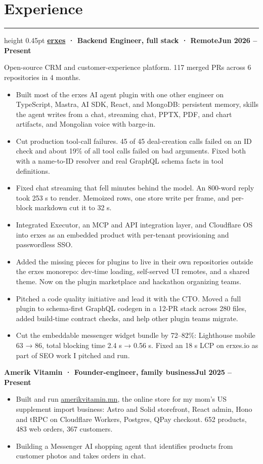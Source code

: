 \documentclass[9.5pt,letterpaper]{article}
\newcommand{\cvsection}[1]{\section*{#1}\vspace{3pt}\hrule height 0.45pt\vspace{3pt}}
\newcommand{\dated}[2]{#1\hfill#2\par}
\begin{document}
\cvsection{Experience}
\dated{\textbf{\href{https://github.com/erxes/erxes}{\textcolor{linkblue}{erxes}} · Backend Engineer, full stack · Remote}}{\textbf{Jun 2026 – Present}}
Open-source CRM and customer-experience platform. 117 merged PRs across 6 repositories in 4 months.
\begin{itemize}
  \item Built most of the erxes AI agent plugin with one other engineer on TypeScript, Mastra, AI SDK, React, and MongoDB: persistent memory, skills the agent writes from a chat, streaming chat, PPTX, PDF, and chart artifacts, and Mongolian voice with barge-in.
  \item Cut production tool-call failures. 45 of 45 deal-creation calls failed on an ID check and about 19\% of all tool calls failed on bad arguments. Fixed both with a name-to-ID resolver and real GraphQL schema facts in tool definitions.
  \item Fixed chat streaming that fell minutes behind the model. An 800-word reply took 253 s to render. Memoized rows, one store write per frame, and per-block markdown cut it to 32 s.
  \item Integrated Executor, an MCP and API integration layer, and Cloudflare OS into erxes as an embedded product with per-tenant provisioning and passwordless SSO.
  \item Added the missing pieces for plugins to live in their own repositories outside the erxes monorepo: dev-time loading, self-served UI remotes, and a shared theme. Now on the plugin marketplace and hackathon organizing teams.
  \item Pitched a code quality initiative and lead it with the CTO. Moved a full plugin to schema-first GraphQL codegen in a 12-PR stack across 280 files, added build-time contract checks, and help other plugin teams migrate.
  \item Cut the embeddable messenger widget bundle by 72–82\%: Lighthouse mobile 63 → 86, total blocking time 2.4 s → 0.56 s. Fixed an 18 s LCP on erxes.io as part of SEO work I pitched and run.
\end{itemize}
\dated{\textbf{Amerik Vitamin · Founder-engineer, family business}}{\textbf{Jul 2025 – Present}}
\begin{itemize}
  \item Built and run \href{https://amerikvitamin.mn}{amerikvitamin.mn}, the online store for my mom's US supplement import business: Astro and Solid storefront, React admin, Hono and tRPC on Cloudflare Workers, Postgres, QPay checkout. 652 products, 483 web orders, 367 customers.
  \item Building a Messenger AI shopping agent that identifies products from customer photos and takes orders in chat.
\end{itemize}
\end{document}
